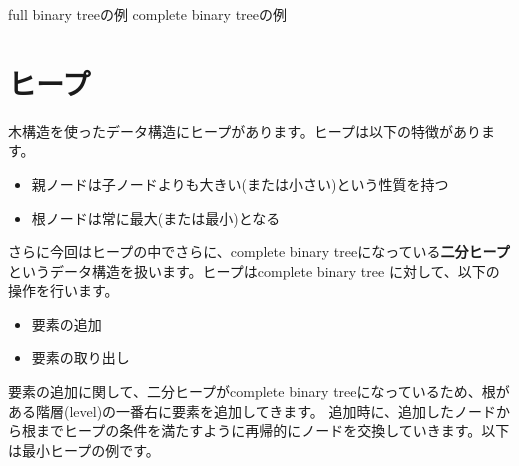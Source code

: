 \hspace{1.5cm} full binary treeの例 \hspace{4.5cm} complete binary treeの例

\newpage

\section{ヒープ}
木構造を使ったデータ構造にヒープがあります。ヒープは以下の特徴があります。

\begin{itemize}
	\item 親ノードは子ノードよりも大きい(または小さい)という性質を持つ
	\item 根ノードは常に最大(または最小)となる
\end{itemize}

さらに今回はヒープの中でさらに、complete binary treeになっている\textbf{二分ヒープ}というデータ構造を扱います。ヒープはcomplete binary tree
に対して、以下の操作を行います。

\begin{itemize}
	\item 要素の追加
	\item 要素の取り出し
\end{itemize}

要素の追加に関して、二分ヒープがcomplete binary treeになっているため、根がある階層(level)の一番右に要素を追加してきます。
追加時に、追加したノードから根までヒープの条件を満たすように再帰的にノードを交換していきます。以下は最小ヒープの例です。

\vspace{1cm}

